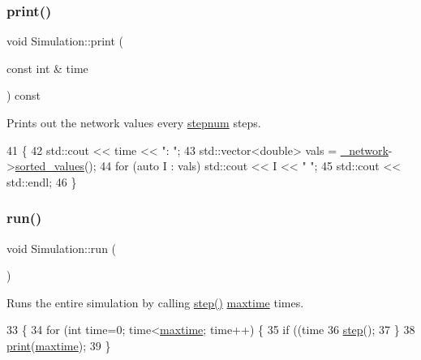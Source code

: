 \subsubsection{\texorpdfstring{print()}{print()}}
{\footnotesize\ttfamily void Simulation\+::print (\begin{DoxyParamCaption}\item[{const int \&}]{time }\end{DoxyParamCaption}) const\hspace{0.3cm}{\ttfamily [private]}}

Prints out the network values every \mbox{\hyperlink{classSimulation_a6bfba2071d6358af042ca417637c6c36}{stepnum}} steps. 
\begin{DoxyCode}
41                                             \{
42     std::cout << time << \textcolor{stringliteral}{": "};
43     std::vector<double> vals = \mbox{\hyperlink{classSimulation_a5f1d8152b13bc4640c8a3fddcfe7eae9}{\_network}}->\mbox{\hyperlink{classNetwork_a07ae19f51e2440a711ced30b1f371197}{sorted\_values}}();
44     \textcolor{keywordflow}{for} (\textcolor{keyword}{auto} I : vals) std::cout << I << \textcolor{stringliteral}{" "};
45     std::cout << std::endl;
46 \}
\end{DoxyCode}
\mbox{\label{classSimulation_ae5c367f87c0b5dc9740bc6d00e44e72c}} 
\subsubsection{\texorpdfstring{run()}{run()}}
{\footnotesize\ttfamily void Simulation\+::run (\begin{DoxyParamCaption}{ }\end{DoxyParamCaption})}

Runs the entire simulation by calling \mbox{\hyperlink{classSimulation_a49899e122ecc9f0eaba8d40182030d24}{step()}} \mbox{\hyperlink{classSimulation_a2db45338d73f8e7823eb85015532be23}{maxtime}} times. 
\begin{DoxyCode}
33                      \{
34     \textcolor{keywordflow}{for} (\textcolor{keywordtype}{int} time=0; time<\mbox{\hyperlink{classSimulation_a2db45338d73f8e7823eb85015532be23}{maxtime}}; time++) \{
35         \textcolor{keywordflow}{if} ((time %
36         \mbox{\hyperlink{classSimulation_a49899e122ecc9f0eaba8d40182030d24}{step}}();
37     \}
38     \mbox{\hyperlink{classSimulation_a261acbceff8d384ea12cb010798504b2}{print}}(\mbox{\hyperlink{classSimulation_a2db45338d73f8e7823eb85015532be23}{maxtime}});
39 \}
\end{DoxyCode}
\mbox{\label{classSimulation_a49899e122ecc9f0eaba8d40182030d24}} 
